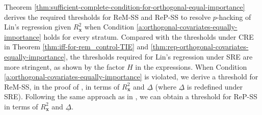 \documentclass[12pt]{article}
\newcommand{\bs}{\boldsymbol}
\begin{document}
Theorem \ref{thm:sufficient-complete-condition-for-orthogonal-equal-importance} derives the required thresholds for ReM-SS and ReP-SS to resolve $p$-hacking of Lin's regression given $R^2_{\bs{x}}$ when Condition \ref{a:orthogonal-covariates-equally-importance} holds for every stratum. Compared with the thresholds under CRE in Theorem \ref{thm:iff-for-rem_control-TIE} and \ref{thm:rep-orthogonal-covariates-equally-importance}, the thresholds required for  Lin's regression under SRE are more stringent, as shown by the factor $H$ in the expressions. When Condition \ref{a:orthogonal-covariates-equally-importance} is violated, we derive a threshold for ReM-SS, in the proof of , in terms of $R^2_{\bs{x}}$ and $\underline{\Delta}$ (where $\underline{\Delta}$ is redefined under SRE). Following the same approach as in , we can obtain a threshold for ReP-SS in terms of $R^2_{\bs{x}}$ and $\underline{\Delta}$.
  
\end{document}
